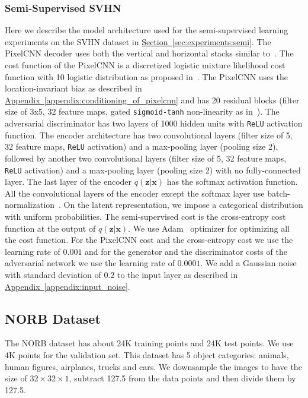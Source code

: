 \documentclass{article}
\newcommand{\mysec}[1]{\hyperref[sec:#1]{Section~\ref*{sec:#1}}}
\newcommand{\myappendix}[1]{\hyperref[appendix:#1]{Appendix~\ref*{appendix:#1}}}
\begin{document}
\begin{appendices}
\subsubsection{Semi-Supervised SVHN}\label{appendix:semi-svhn}
Here we describe the model architecture used for the semi-supervised learning experiments on the SVHN dataset in \mysec{experiments:semi}.
The PixelCNN decoder uses both the vertical and horizontal stacks similar to~\citep{pixelcnn}. 
The cost function of the PixelCNN is a discretized logistic mixture likelihood cost function with 10 logistic distribution as proposed in~\citep{pixelcnn++}.
The PixelCNN uses the location-invariant bias as described in \myappendix{conditioning_of_pixelcnn} and has 20 residual blocks (filter size of 3x5, 32 feature maps, gated \texttt{sigmoid-tanh} non-linearity as in~\citep{pixelcnn}).
The adversarial discriminator has two layers of 1000 hidden units with \texttt{ReLU} activation function. 
The encoder architecture has two convolutional layers (filter size of 5, 32 feature maps, \texttt{ReLU} activation) and a max-pooling layer (pooling size 2), followed by another two convolutional layers (filter size of 5, 32 feature maps, \texttt{ReLU} activation) and a max-pooling layer (pooling size 2) with no fully-connected layer. The last layer of the encoder $q(\mathbf{z}|\mathbf{x})$ has the softmax activation function. 
All the convolutional layers of the encoder except the softmax layer use batch-normalization~\citep{batch}. 
On the latent representation, we impose a categorical distribution with uniform probabilities. 
The semi-supervised cost is the cross-entropy cost function at the output of $q(\mathbf{z}|\mathbf{x})$. We use Adam~\citep{Adam} optimizer for optimizing all the cost function. 
For the PixelCNN cost and the cross-entropy cost we use the learning rate of $0.001$ and for the generator and the discriminator costs of the adversarial network we use the learning rate of $0.0001$.
We add a Gaussian noise with standard deviation of $0.2$ to the input layer as described in \myappendix{input_noise}.

\subsection{NORB Dataset}\label{appendix:norb}
The NORB dataset has about 24K training points and 24K test points. We use 4K points for the validation set. This dataset has 5 object categories: animals, human figures, airplanes, trucks and cars. We downsample the images to have the size of $32 \times 32 \times 1$, subtract 127.5 from the data points and then divide them by 127.5.


\end{appendices}
\end{document}
